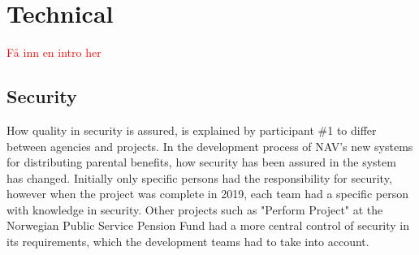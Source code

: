 





\section{Technical}

\textcolor{red}{Få inn en intro her}

\subsection{Security}
How quality in security is assured, is explained by participant \#1 to differ between agencies and projects. In the development process of NAV's new systems for distributing parental benefits, how security has been assured in the system has changed. Initially only specific persons had the responsibility for security, however when the project was complete in 2019, each team had a specific person with knowledge in security. Other projects such as "Perform Project" at the Norwegian Public Service Pension Fund had a more central control of security in its requirements, which the development teams had to take into account.

